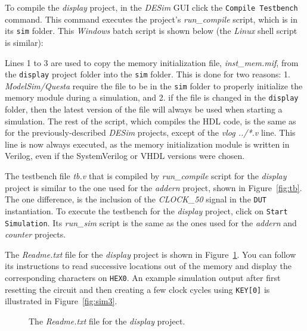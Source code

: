 \clearpage
\newpage
\noindent
To compile the {\it display} project, in the {\it DESim} GUI click the \texttt{Compile Testbench}
command. This command executes the project's {\it run\_compile} script, which
is in its \texttt{sim} folder. This {\it Windows} batch script is shown below (the {\it Linux}
shell script is similar):



Lines 1 to 3 are used to copy the memory initialization file,
{\it inst\_mem.mif}, from the \texttt{display} project folder into the \texttt{sim}
folder. This is done for two reasons: 1. {\it ModelSim/Questa} require the file to be in the
\texttt{sim} folder to properly initialize the memory module during a simulation, and 2. 
if the file is changed in the \texttt{display} folder, then the latest version of the file 
will always be used when starting a simulation. The rest of the script, which compiles the 
HDL code, is the same as for the previously-described {\it DESim} projects, except of the 
{\it vlog ../*.v} line. This line is now always executed, as the memory initialization module 
is written in Verilog, even if the SystemVerilog or VHDL versions were chosen.

The testbench file {\it tb.v} that is compiled by {\it run\_compile} script for the {\it display}
project is similar to the one used for the {\it addern} project, shown in Figure~\ref{fig:tb}. The
one difference, is the inclusion of the {\it CLOCK\_50} signal in the \texttt{DUT} instantiation.
To execute the testbench for the {\it display} project, click on 
\texttt{Start Simulation}. Its {\it run\_sim} script is the same as the 
ones used for the {\it addern} and {\it counter} projects.

The {\it Readme.txt} file for the {\it display} project is shown in Figure~\ref{fig:readme2}.
You can follow its instructions to read successive locations out of the memory and
display the corresponding characters on \texttt{HEX0}. An example simulation output after
first resetting the circuit and then creating a few clock cycles using \texttt{KEY[0]}
is illustrated in Figure~\ref{fig:sim3}.

\lstset{language=make,escapechar=|}
\begin{figure}[h]
\begin{center}
\begin{minipage}[t]{12.5 cm}
	
\end{minipage}
    \caption{The {\it Readme.txt} file for the {\it display} project.}
\label{fig:readme2}
\end{center}
\end{figure}

